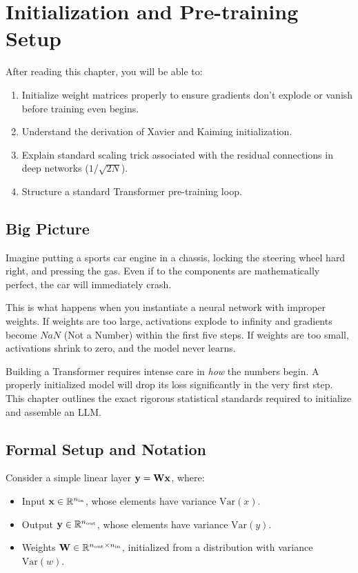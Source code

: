 \chapter{Initialization and Pre-training Setup}
\label{ch:12}

\begin{keyinsight}
After reading this chapter, you will be able to:
\begin{enumerate}
  \item Initialize weight matrices properly to ensure gradients don't explode or vanish before training even begins.
  \item Understand the derivation of Xavier and Kaiming initialization.
  \item Explain standard scaling trick associated with the residual connections in deep networks ($1/\sqrt{2N}$).
  \item Structure a standard Transformer pre-training loop.
\end{enumerate}
\end{keyinsight}

\section{Big Picture}
\label{ch:12:sec:big_picture}

Imagine putting a sports car engine in a chassis, locking the steering wheel hard right, and pressing the gas. Even if to the components are mathematically perfect, the car will immediately crash.

This is what happens when you instantiate a neural network with improper weights. If weights are too large, activations explode to infinity and gradients become $NaN$ (Not a Number) within the first five steps. If weights are too small, activations shrink to zero, and the model never learns. 

Building a Transformer requires intense care in \emph{how} the numbers begin. A properly initialized model will drop its loss significantly in the very first step. This chapter outlines the exact rigorous statistical standards required to initialize and assemble an LLM.

\section{Formal Setup and Notation}
\label{ch:12:sec:setup}

Consider a simple linear layer $\mathbf{y} = \mathbf{W} \mathbf{x}$, where:
\begin{itemize}
    \item Input $\mathbf{x} \in \mathbb{R}^{n_{\text{in}}}$, whose elements have variance $\text{Var}(x)$.
    \item Output $\mathbf{y} \in \mathbb{R}^{n_{\text{out}}}$, whose elements have variance $\text{Var}(y)$.
    \item Weights $\mathbf{W} \in \mathbb{R}^{n_{\text{out}} \times n_{\text{in}}}$, initialized from a distribution with variance $\text{Var}(w)$.
\end{itemize}


